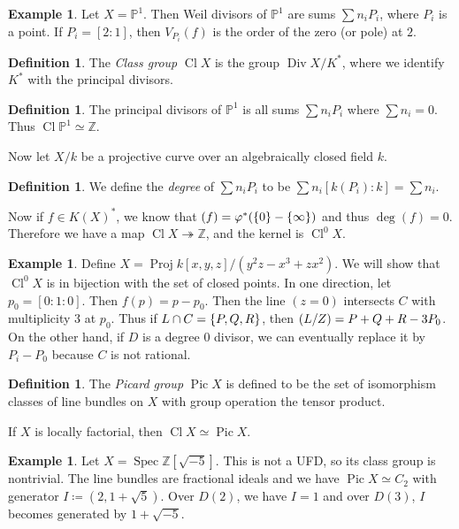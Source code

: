 \documentclass[leqno, openany]{memoir}
\theoremstyle{definition}
\newtheorem{defn}[thm]{Definition}
\newtheorem{exm}[thm]{Example}
\theoremstyle{remark}
\theoremstyle{plain}
\theoremstyle{definition}
\theoremstyle{remark}
\newcommand{\Z}{\mathbb{Z}}
\renewcommand{\P}{\mathbb{P}}
\DeclareMathOperator{\Pic}{Pic}
\DeclareMathOperator{\Cl}{Cl}
\DeclareMathOperator{\Spec}{Spec}
\DeclareMathOperator{\Proj}{Proj}
\begin{document}
\begin{exm} Let $X =\P^1$. Then Weil divisors of $\P^1$ are sums $\sum n_i
P_i$, where $P_i$ is a point. If $P_i = [2:1]$, then $V_{P_i}(f)$ is the order
of the zero (or pole) at $2$.  \end{exm}

\begin{defn} The \textit{Class group} $\operatorname{Cl} X$ is the group
$\operatorname{Div} X / K^*$, where we identify $K^*$ with the principal
divisors.  \end{defn}

\begin{defn} The principal divisors of $\P^1$ is all sums $\sum n_i P_i$ where
$\sum n_i = 0$. Thus $\operatorname{Cl} \P^1 \simeq \Z$.  \end{defn}

Now let $X/k$ be a projective curve over an algebraically closed field $k$.

\begin{defn} We define the \textit{degree} of $\sum n_i P_i$ to be $\sum n_i
[k(P_i):k] = \sum n_i$.  \end{defn}

Now if $f \in K(X)^*$, we know that $(f) = \varphi^*(\qty{0} - \qty{\infty})$
and thus $\deg (f) = 0$. Therefore we have a map $\operatorname{Cl} X
\twoheadrightarrow \Z$, and the kernel is $\operatorname{Cl}^0 X$.

\begin{exm} Define $X = \Proj k[x,y,z] / (y^2 z - x^3 + zx^2)$. We will show
    that $\Cl^0 X$ is in bijection with the set of closed points. In one
    direction, let $p_0 = [0:1:0]$. Then $f(p) = p - p_0$. Then the line
    $(z=0)$ intersects $C$ with multiplicity $3$ at $p_0$. Thus if $L \cap C =
    \qty{P,Q,R}$, then $\qty(L/Z) = P + Q + R - 3 P_0$. On the other hand, if
    $D$ is a degree $0$ divisor, we can eventually replace it by $P_i - P_0$
    because $C$ is not rational.  \end{exm}

\begin{defn} The \textit{Picard group} $\Pic X$ is defined to be the set of
isomorphism classes of line bundles on $X$ with group operation the tensor
product.  \end{defn}

If $X$ is locally factorial, then $\Cl X \simeq \Pic X$.

\begin{exm} Let $X = \Spec \Z[\sqrt{-5}]$. This is not a UFD, so its class
    group is nontrivial. The line bundles are fractional ideals and we have
    $\Pic X \simeq C_2$ with generator $I \coloneqq (2, 1 + \sqrt{5})$. Over
    $D(2)$, we have $I = 1$ and over $D(3)$, $I$ becomes generated by $1 +
    \sqrt{-5}$.  \end{exm}
\end{document}
